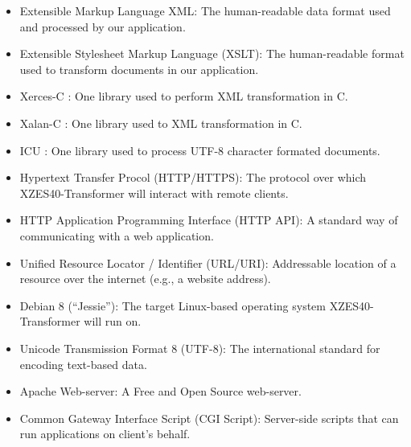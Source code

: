 \begin{itemize}
  \item Extensible Markup Language XML: The human-readable data format used and processed by our application.
  \item Extensible Stylesheet Markup Language (XSLT): The human-readable format used to transform documents in our application.
  \item Xerces-C \cite{xerces}: One library used to perform XML transformation in C.
  \item Xalan-C \cite{xalan}: One library used to XML transformation in C.
  \item ICU \cite{icu}: One library used to process UTF-8 character formated documents.
  \item Hypertext Transfer Procol (HTTP/HTTPS): The protocol over which XZES40-Transformer will interact with remote clients.
  \item HTTP Application Programming Interface (HTTP API): A standard way of communicating with a web application.
  \item Unified Resource Locator / Identifier (URL/URI): Addressable location of a resource over the internet (e.g., a website address).
  \item Debian 8 (``Jessie''): The target Linux-based operating system XZES40-Transformer will run on.
  \item Unicode Transmission Format 8 (UTF-8): The international standard for encoding text-based data.
  \item Apache Web-server: A Free and Open Source web-server.
  \item Common Gateway Interface Script (CGI Script): Server-side scripts that can run applications on client's behalf.
\end{itemize}
% 
% 
